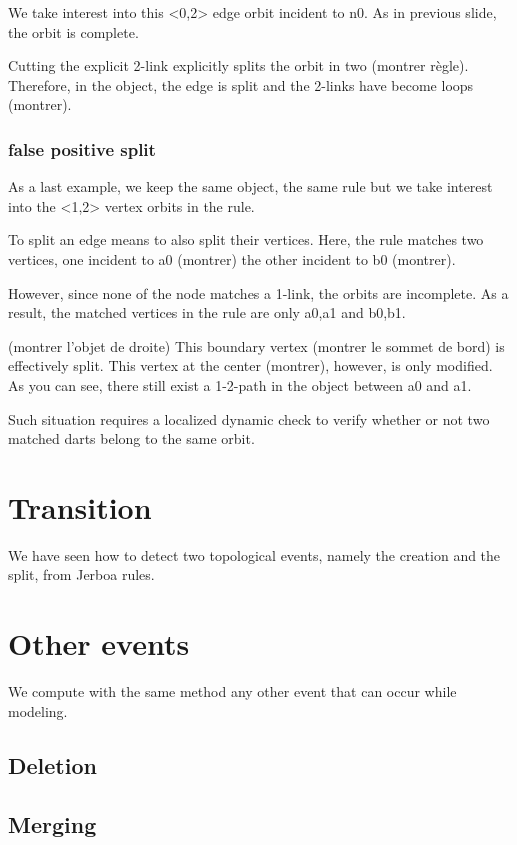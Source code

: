 \documentclass[11pt]{article}
\begin{document}
We take interest into this <0,2> edge orbit incident to n0.
As in previous slide, the orbit is complete.

Cutting the explicit 2-link explicitly splits the orbit in two (montrer règle).
Therefore, in the object, the edge is split and the 2-links have become loops
(montrer).


\subsubsection{false positive split}
\label{sec:orga5be99c}
As a last example, we keep the same object, the same rule but we take interest
into the <1,2> vertex orbits in the rule.

To split an edge means to also split their vertices. Here, the rule matches two
vertices, one incident to a0 (montrer) the other incident to b0 (montrer).

However, since none of the node matches a 1-link, the orbits are incomplete. As
a result, the matched vertices in the rule are only a0,a1 and b0,b1.

(montrer l'objet de droite) This boundary vertex (montrer le sommet de bord) is
effectively split. This vertex at the center (montrer), however, is only
modified. As you can see, there still exist a 1-2-path in the object between a0
and a1.

Such situation requires a localized dynamic check to verify whether or not two
matched darts belong to the same orbit.

\section{Transition}
\label{sec:org56300de}

We have seen how to detect two topological events, namely the creation and the
split, from Jerboa rules.

\section{Other events}
\label{sec:org1e3080b}
We compute with the same method any other event that can occur while modeling.
\subsection{Deletion}
\label{sec:orga0d79b0}
\subsection{Merging}
\label{sec:org1468a98}
\end{document}
